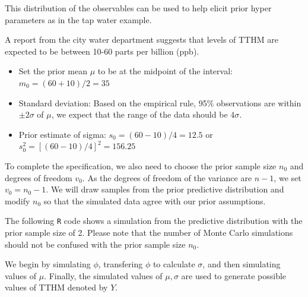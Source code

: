 \documentclass[]{book}
\theoremstyle{definition}
\theoremstyle{definition}
\theoremstyle{definition}
\theoremstyle{remark}
\begin{document}
This distribution of the observables can be used to help elicit prior
hyper parameters as in the tap water example.

A report from the city water department suggests that levels of TTHM are
expected to be between 10-60 parts per billion (ppb).

\begin{itemize}
\item
  Set the prior mean \(\mu\) to be at the midpoint of the interval:
  \(m_0 = (60+10)/2 = 35\)
\item
  Standard deviation: Based on the empirical rule, 95\% observations are
  within \(\pm 2\sigma\) of \(\mu\), we expect that the range of the
  data should be \(4\sigma\).
\item
  Prior estimate of sigma: \(s_0 = (60-10)/4 = 12.5\) or
  \(s_0^2 = [(60-10)/4]^2 = 156.25\)
\end{itemize}

To complete the specification, we also need to choose the prior sample
size \(n_0\) and degrees of freedom \(v_0\). As the degrees of freedom
of the variance are \(n-1\), we set \(v_0 = n_0 - 1\). We will draw
samples from the prior predictive distribution and modify \(n_0\) so
that the simulated data agree with our prior assumptions.

The following \texttt{R} code shows a simulation from the predictive
distribution with the prior sample size of 2. Please note that the
number of Monte Carlo simulations should not be confused with the prior
sample size \(n_0\).

We begin by simulating \(\phi\), transfering \(\phi\) to calculate
\(\sigma\), and then simulating values of \(\mu\). Finally, the
simulated values of \(\mu,\sigma\) are used to generate possible values
of TTHM denoted by \(Y\).
\end{document}
